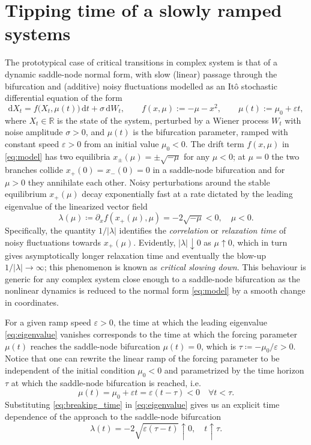 \documentclass[11pt,a4paper]{article}
\theoremstyle{plain}
\theoremstyle{definition}
\theoremstyle{remark}
\newcommand{\dd}{\mathrm{d}}
\begin{document}
\section{Tipping time of a slowly ramped systems}\label{sec:tipping}
The prototypical case of critical transitions in complex system is that of a dynamic saddle-node normal form, with slow (linear) passage through the bifurcation and (additive) noisy fluctuations modelled as an It\^o stochastic differential equation of the form
%
\begin{equation}\label{eq:model}
\dd X_t=f\bigl(X_t,\mu(t)\bigr)\,\dd t+\sigma\,\dd W_t,
\qquad
f(x,\mu):=-\mu-x^2,
\qquad
\mu(t):=\mu_0+\varepsilon t ,
\end{equation}
%
where $X_t\in\mathbb R$ is the state of the system, perturbed by a Wiener process $W_t$ with noise amplitude $\sigma>0$, and $\mu(t)$ is the bifurcation parameter, ramped with constant speed $\varepsilon>0$ from an initial value $\mu_0<0$.
The drift term $f(x,\mu)$ in \eqref{eq:model} has two equilibria $x_{\pm}(\mu)=\pm\sqrt{-\mu}$ for any $\mu<0$; at $\mu=0$ the two branches collide $x_+(0)=x_-(0)=0$ in a saddle-node bifurcation and for $\mu>0$ they annihilate each other.
Noisy perturbations around the stable equilibrium $x_+(\mu)$ decay exponentially fast at a rate dictated by the leading eigenvalue of the linearized vector field
%
\begin{equation}\label{eq:eigenvalue}
        \lambda(\mu)\coloneqq\partial_xf(x_+(\mu),\mu)=-2\sqrt{-\mu}<0 , \quad \mu<0 .
\end{equation}
%
Specifically, the quantity $1/|\lambda|$ identifies the \emph{correlation} or \emph{relaxation time} of noisy fluctuations towards $x_+(\mu)$.
Evidently, $|\lambda|\downarrow0$ as $\mu\uparrow0$, which in turn gives asymptotically longer relaxation time and eventually the blow-up $1/|\lambda|\to\infty$; this phenomenon is known as \emph{critical slowing down}.
This behaviour is generic for any complex system close enough to a saddle-node bifurcation as the nonlinear dynamics is reduced to the normal form \eqref{eq:model} by a smooth change in coordinates.

For a given ramp speed $\varepsilon>0$, the time at which the leading eigenvalue \eqref{eq:eigenvalue} vanishes corresponds to the time at which the forcing parameter $\mu(t)$ reaches the saddle-node bifurcation $\mu(t)=0$, which is $\tau\coloneqq-\mu_0/\varepsilon>0$.
Notice that one can rewrite the linear ramp of the forcing parameter to be independent of the initial condition $\mu_0<0$ and parametrized by the time horizon $\tau$ at which the saddle-node bifurcation is reached, i.e.
%
\begin{equation}\label{eq:breaking_time}
        \mu(t) = \mu_0 + \varepsilon t = \varepsilon(t-\tau)<0\quad\forall t<\tau .
\end{equation}
%
Substituting \eqref{eq:breaking_time} in \eqref{eq:eigenvalue} gives us an explicit time dependence of the approach to the saddle-node bifurcation
%
\begin{equation}\label{eq:eigenvalue_time}
        \lambda(t) = -2\sqrt{\varepsilon(\tau-t)}\uparrow0 ,\quad t\uparrow\tau .
\end{equation}
\end{document}
